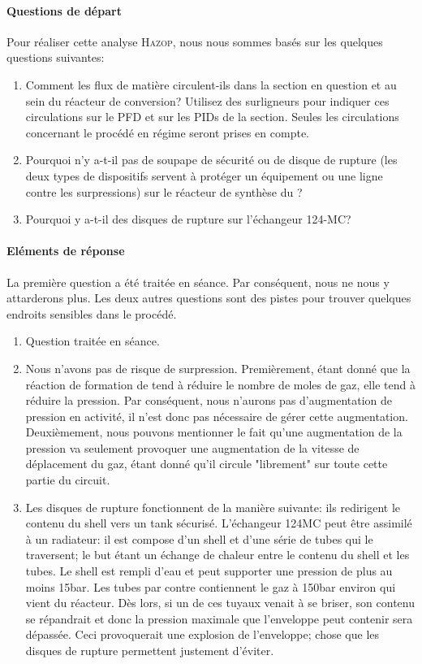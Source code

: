 \paragraph{Questions de départ} Pour réaliser cette analyse \textsc{Hazop}, nous nous sommes basés sur les quelques questions 
suivantes:
\begin{enumerate}
\item Comment les flux de matière circulent-ils dans la section en question et au sein du réacteur de conversion?
Utilisez des surligneurs pour indiquer ces circulations sur le PFD et sur les PIDs de la section. Seules
les circulations concernant le procédé en régime seront prises en compte.
\item Pourquoi n’y a-t-il pas de soupape de sécurité ou de disque de rupture (les deux types de dispositifs
servent à protéger un équipement ou une ligne contre les surpressions) sur le réacteur de synthèse du ?
\item Pourquoi y a-t-il des disques de rupture sur l’échangeur 124-MC?
\end{enumerate}

\paragraph{Eléments de réponse} La première question a été traitée en séance. Par conséquent, nous ne nous y attarderons 
plus. Les deux autres questions sont des pistes pour trouver quelques endroits sensibles dans le procédé.

\begin{enumerate}
\item Question traitée en séance.
\item Nous n'avons pas de risque de surpression. Premièrement, étant donné que la réaction de formation de  tend à
réduire le nombre de moles de gaz, elle tend à réduire la pression. Par conséquent, nous n'aurons pas d'augmentation de
pression en activité, il n'est donc pas nécessaire de gérer cette augmentation. Deuxièmement, nous pouvons mentionner le
fait qu'une augmentation de la pression va seulement provoquer une augmentation de la vitesse de déplacement du gaz, étant
donné qu'il circule "librement" sur toute cette partie du circuit.
\item Les disques de rupture fonctionnent de la manière suivante: ils
redirigent le contenu du shell vers un tank sécurisé. L'échangeur 124MC peut être assimilé à un radiateur: 
il est compose d'un shell et d'une série de tubes qui le traversent; le but étant un échange de chaleur entre le 
contenu du shell et les tubes. Le shell est rempli d'eau et peut supporter une pression de plus au moins \unit{15}{bar}. 
Les tubes par contre contiennent le gaz à \unit{150}{bar} environ qui vient du réacteur. Dès lors, si un de ces tuyaux 
venait à se briser, son contenu se répandrait et donc la pression maximale que l'enveloppe peut contenir sera dépassée. 
Ceci provoquerait une explosion de l'enveloppe; chose que les disques de rupture permettent justement d'éviter. 
\end{enumerate}

